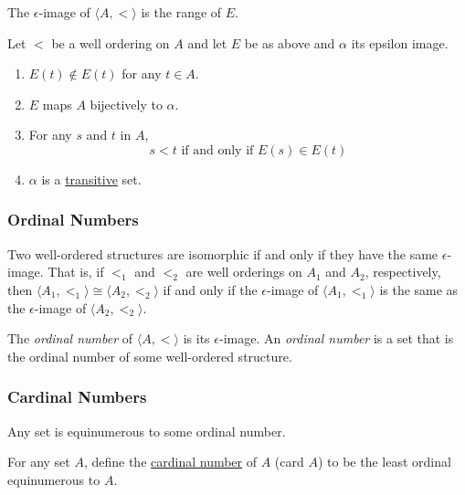 \noindent The $\epsilon$-image of $\langle A, < \rangle$ is the range of $E$.

\begin{proposition}
Let $<$ be a well ordering on $A$ and let $E$ be as above and $\alpha$ its epsilon image.
\begin{enumerate}
  \item $E(t) \not\in E(t)$ for any $t \in A.$
  \item $E$ maps $A$ bijectively to $\alpha$.
  \item For any $s$ and $t$ in $A$,
  				$$s < t \textrm{  if and only if  } E(s) \in E(t)$$
  \item $\alpha$ is a \hyperref[transitiveset]{transitive} set.
\end{enumerate}
\end{proposition}

\subsubsection{Ordinal Numbers}\label{ordinalnumberdefinition}

\begin{proposition}
Two well-ordered structures are isomorphic if and only if they have the same $\epsilon$-image.
That is, if $<_1$ and $<_2$ are well orderings on $A_1$ and $A_2$, respectively, then $\langle A_1, <_1 \rangle \cong \langle A_2, <_2 \rangle$
if and only if the $\epsilon$-image of $\langle A_1, <_1 \rangle$ is the same as the $\epsilon$-image of $\langle A_2, <_2 \rangle$.
\end{proposition}

The \emph{ordinal number} of $\langle A, < \rangle$ is its $\epsilon$-image. An \emph{ordinal number} is a set that is the ordinal number of some well-ordered structure.

\subsubsection{Cardinal Numbers}\label{cardinalnumberdefinition}

\begin{theorem}
Any set is equinumerous to some ordinal number.
\end{theorem}

For any set $A$, define the \hyperref[cardinalnumbers]{cardinal number} of $A$ (card $A$) to be the least ordinal equinumerous to $A$.
